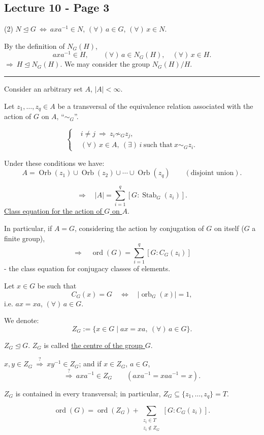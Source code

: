 
\subsection*{Lecture 10 - Page 3}

\noindent (2) \quad
$N\trianglelefteq G\ \Longleftrightarrow\ axa^{-1}\in N$,
\quad $(\forall)\,a\in G$, $(\forall)\,x\in N$.

\medskip
\noindent By the definition of $N_G(H)$,
\[
axa^{-1}\in H, \qquad
(\forall)\,a\in N_G(H),\quad (\forall)\,x\in H.
\]
\noindent $\Longrightarrow\ H\trianglelefteq N_G(H)$.
We may consider the group $N_G(H)/H$.

\bigskip
\hrule
\bigskip

\noindent Consider an arbitrary set $A$, $|A|<\infty$.

\medskip
\noindent Let $z_1,\ldots,z_q\in A$ be a transversal of the equivalence
relation associated with the action of $G$ on $A$, ``$\sim_G$''.

\[
\left\{\begin{aligned}
&i\neq j\ \Longrightarrow\ z_i\not\sim_G z_j,\\
&(\forall)\,x\in A,\ (\exists)\,i\ \text{such that}\ x\sim_G z_i.
\end{aligned}\right.
\]

\noindent Under these conditions we have:
\[
A=\operatorname{Orb}(z_1)\cup\operatorname{Orb}(z_2)
\cup\cdots\cup\operatorname{Orb}(z_q)
\qquad (\text{disjoint union}).
\]

\[
\Longrightarrow\quad
|A|=\sum_{i=1}^{q}[G:\operatorname{Stab}_G(z_i)].
\]
\noindent \underline{Class equation for the action of $G$ on $A$}.

\bigskip
\noindent In particular, if $A=G$, considering the action by conjugation
of $G$ on itself ($G$ a finite group),
\[
\Longrightarrow\quad
\operatorname{ord}(G)=\sum_{i=1}^{q}[G:C_G(z_i)]
\]
\noindent - the class equation for conjugacy classes of elements.

\bigskip
\noindent Let $x\in G$ be such that
\[
C_G(x)=G\quad\Longleftrightarrow\quad
|\operatorname{orb}_G(x)|=1,
\]
\noindent i.e. $ax=xa$, $(\forall)\,a\in G$.

\bigskip
\noindent We denote:
\[
Z_G:=\{x\in G\mid ax=xa,\ (\forall)\,a\in G\}.
\]

\noindent $Z_G\trianglelefteq G$.
\quad $Z_G$ is called \underline{the centre of the group $G$}.

\medskip
\noindent $x,y\in Z_G\ \stackrel{?}{\Longrightarrow}\ xy^{-1}\in Z_G$;
\quad and if $x\in Z_G$, $a\in G$,
\[
\stackrel{?}{\Longrightarrow}\ axa^{-1}\in Z_G
\qquad (axa^{-1}=xaa^{-1}=x).
\]

\bigskip
\noindent $Z_G$ is contained in every transversal; in particular,
$Z_G\subseteq\{z_1,\ldots,z_q\}=T$.

\[
\operatorname{ord}(G)=\operatorname{ord}(Z_G)
+\sum_{\substack{z_i\in T\\z_i\notin Z_G}}[G:C_G(z_i)].
\]
